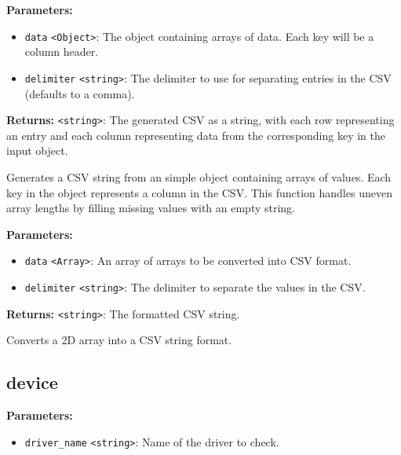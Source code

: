 \documentclass[12pt,a4paper]{article}
\begin{document}
\noindent \textbf{Parameters:}
\begin{itemize}
  \item \texttt{data} \texttt{<Object>}: The object containing arrays of data. Each key will be a column header.
  \item \texttt{delimiter} \texttt{<string>}: The delimiter to use for separating entries in the CSV (defaults to a comma).
\end{itemize}

\noindent \textbf{Returns:} \texttt{<string>}: The generated CSV as a string, with each row representing an entry and each column representing data from the corresponding key in the input object.

\noindent Generates a CSV string from an simple object containing arrays of values.
Each key in the object represents a column in the CSV. This function handles uneven array lengths by filling missing values with an empty string.

\vspace{5mm}
\noindent {}


\noindent \textbf{Parameters:}
\begin{itemize}
  \item \texttt{data} \texttt{<Array>}: An array of arrays to be converted into CSV format.
  \item \texttt{delimiter} \texttt{<string>}: The delimiter to separate the values in the CSV.
\end{itemize}

\noindent \textbf{Returns:} \texttt{<string>}: The formatted CSV string.

\noindent Converts a 2D array into a CSV string format.


\subsection{device}
\vspace{5mm}
\noindent {}


\noindent \textbf{Parameters:}
\begin{itemize}
  \item \texttt{driver\_name} \texttt{<string>}: Name of the driver to check.
\end{itemize}
\end{document}
